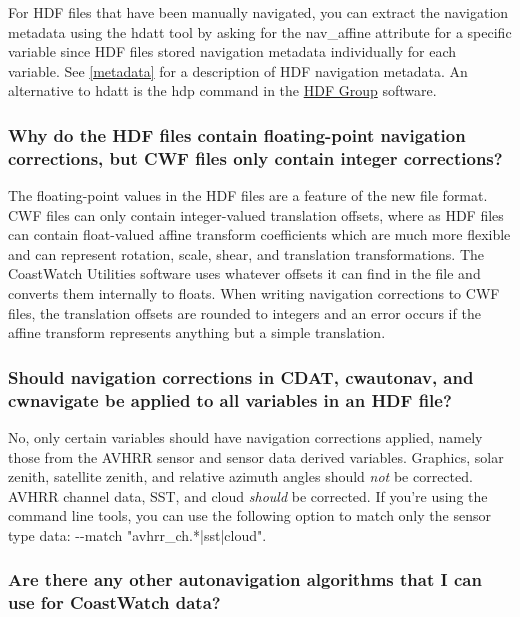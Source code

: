 For HDF files that have been manually navigated, you can extract the
navigation metadata using the hdatt tool by asking for the {\file
nav\_affine} attribute for a specific variable since HDF files stored
navigation metadata individually for each variable.  See
\autoref{metadata} for a description of HDF navigation metadata.  An
alternative to hdatt is the hdp command in the
\href{http://www.hdfgroup.org}{HDF Group} software.

\subsubsection*{Why do the HDF files contain floating-point navigation corrections, but CWF files only contain integer corrections?}

The floating-point values in the HDF files are a feature of the new
file format.  CWF files can only contain integer-valued translation
offsets, where as HDF files can contain float-valued affine transform
coefficients which are much more flexible and can represent rotation,
scale, shear, and translation transformations.  The CoastWatch
Utilities software uses whatever offsets it can find in the file and
converts them internally to floats.  When writing navigation
corrections to CWF files, the translation offsets are rounded to
integers and an error occurs if the affine transform represents
anything but a simple translation.

\subsubsection*{Should navigation corrections in CDAT, cwautonav, and cwnavigate be applied to all variables in an HDF file?}

No, only certain variables should have navigation corrections applied,
namely those from the AVHRR sensor and sensor data derived variables.
Graphics, solar zenith, satellite zenith, and relative azimuth angles
should {\em not} be corrected.  AVHRR channel data, SST, and cloud
{\em should} be corrected.  If you're using the command line tools,
you can use the following option to match only the sensor type data:
{\file -{-}match "avhrr\_ch.*|sst|cloud"}.

\subsubsection*{Are there any other autonavigation algorithms that I can use for CoastWatch data?}

